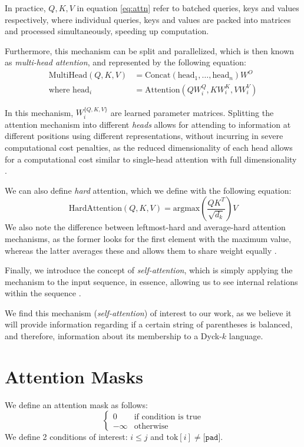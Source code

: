 In practice, $Q, K, V$ in equation \ref{eq:attn} refer to batched queries, keys and values respectively, where individual queries, keys and values are packed into matrices and processed simultaneously, speeding up computation.

Furthermore, this mechanism can be split and parallelized, which is then known as \emph{multi-head attention}, and represented by the following equation:
\begin{equation} \label{eq:multihead-attn}
    \begin{split}
        \text{MultiHead}(Q, K, V) &= \text{Concat}(\text{head}_1, \dots, \text{head}_n)W^O \\
        \text{where head}_i &= \text{Attention}(QW_{i}^{Q}, KW_{i}^K, VW_{i}^V)
    \end{split}
\end{equation}

In this mechanism, $W_{i}^{\{Q, K, V\}}$ are learned parameter matrices. Splitting the attention mechanism into different \emph{heads} allows for attending to information at different positions using different representations, without incurring in severe computational cost penalties, as the reduced dimensionality of each head allows for a computational cost similar to single-head attention with full dimensionality \cite{attention_is_all_you_need}.

We can also define \emph{hard} attention, which we define with the following equation:
\begin{equation}
    \text{HardAttention}(Q, K, V) = \text{argmax}\left( \frac{QK^T}{\sqrt{d_k}}\right)V
\end{equation}
We also note the difference between leftmost-hard and average-hard attention mechanisms, as the former looks for the first element with the maximum value, whereas the latter averages these and allows them to share weight equally \cite{strobl2024formal}.

Finally, we introduce the concept of \emph{self-attention}, which is simply applying the mechanism to the input sequence, in essence, allowing us to see internal relations within the sequence \cite{attention_is_all_you_need}.

We find this mechanism (\emph{self-attention}) of interest to our work, as we believe it will provide information regarding if a certain string of parentheses is balanced, and therefore, information about its membership to a Dyck-$k$ language.

\section{Attention Masks} \label{section:attn_masks}
We define an attention mask as follows:
\begin{equation}
    \begin{cases}
         0 & \text{if condition is true}  \\
         -\infty & \text{otherwise}
    \end{cases}
\end{equation}
We define 2 conditions of interest: $i\leq j$ and $\text{tok}[i] \neq \texttt{[pad]}$.


